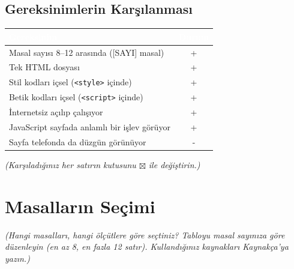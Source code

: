 \documentclass[12pt,a4paper]{article}
\newcommand{\aciklama}[1]{{\color{gray}\itshape (#1)}}
\begin{document}
\subsection{Gereksinimlerin Karşılanması}
\begin{center}
\begin{tabular}{@{}p{8.2cm}c@{}}
\toprule
\rowcolor{ana}\textcolor{white}{\textbf{Gereksinim}} & \textcolor{white}{\textbf{Durum}} \\
\midrule
Masal sayısı 8--12 arasında ([SAYI] masal)         & +\\
Tek HTML dosyası                                    & +\\
Stil kodları içsel (\texttt{<style>} içinde)        & +\\
Betik kodları içsel (\texttt{<script>} içinde)      & +\\
İnternetsiz açılıp çalışıyor                        & +\\
JavaScript sayfada anlamlı bir işlev görüyor        & +\\
Sayfa telefonda da düzgün görünüyor                 & -\\
\bottomrule
\end{tabular}
\end{center}
\aciklama{Karşıladığınız her satırın kutusunu $\boxtimes$ ile değiştirin.}

\section{Masalların Seçimi}
\aciklama{Hangi masalları, hangi ölçütlere göre seçtiniz? Tabloyu masal sayınıza göre
düzenleyin (en az 8, en fazla 12 satır). Kullandığınız kaynakları Kaynakça'ya yazın.}
\end{document}

